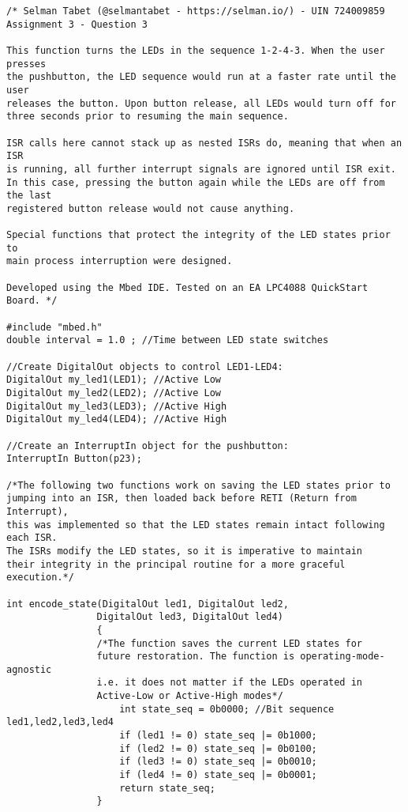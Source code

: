 \documentclass{article}
\begin{document}
\begin{verbatim}
/* Selman Tabet (@selmantabet - https://selman.io/) - UIN 724009859
Assignment 3 - Question 3

This function turns the LEDs in the sequence 1-2-4-3. When the user presses
the pushbutton, the LED sequence would run at a faster rate until the user
releases the button. Upon button release, all LEDs would turn off for
three seconds prior to resuming the main sequence.

ISR calls here cannot stack up as nested ISRs do, meaning that when an ISR
is running, all further interrupt signals are ignored until ISR exit.
In this case, pressing the button again while the LEDs are off from the last
registered button release would not cause anything.

Special functions that protect the integrity of the LED states prior to
main process interruption were designed.

Developed using the Mbed IDE. Tested on an EA LPC4088 QuickStart Board. */

#include "mbed.h"
double interval = 1.0 ; //Time between LED state switches

//Create DigitalOut objects to control LED1-LED4:
DigitalOut my_led1(LED1); //Active Low
DigitalOut my_led2(LED2); //Active Low
DigitalOut my_led3(LED3); //Active High
DigitalOut my_led4(LED4); //Active High

//Create an InterruptIn object for the pushbutton:
InterruptIn Button(p23);

/*The following two functions work on saving the LED states prior to 
jumping into an ISR, then loaded back before RETI (Return from Interrupt),
this was implemented so that the LED states remain intact following each ISR.
The ISRs modify the LED states, so it is imperative to maintain
their integrity in the principal routine for a more graceful execution.*/

int encode_state(DigitalOut led1, DigitalOut led2, 
                DigitalOut led3, DigitalOut led4)
                {
                /*The function saves the current LED states for 
                future restoration. The function is operating-mode-agnostic
                i.e. it does not matter if the LEDs operated in
                Active-Low or Active-High modes*/
                    int state_seq = 0b0000; //Bit sequence led1,led2,led3,led4
                    if (led1 != 0) state_seq |= 0b1000;
                    if (led2 != 0) state_seq |= 0b0100;
                    if (led3 != 0) state_seq |= 0b0010;
                    if (led4 != 0) state_seq |= 0b0001;
                    return state_seq;
                }
                

\end{verbatim}
\end{document}
